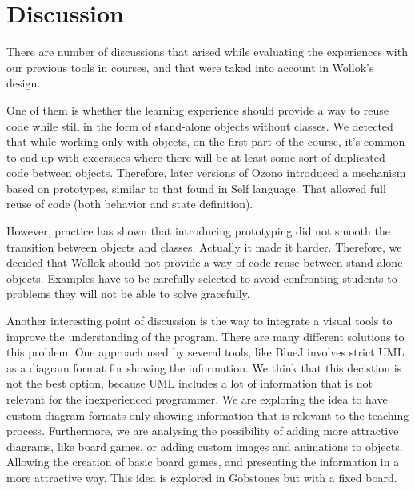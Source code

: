 \section{Discussion}
\label{sec:discussion}

There are number of discussions that arised while evaluating the experiences
with our previous tools in courses, and that were taked into account in Wollok's
design.

One of them is whether the learning experience should provide a way to reuse
code while still in the form of stand-alone objects without classes.
We detected that while working only with objects, on the first part of the
course, it's common to end-up with excersices where there will be at least some
sort of duplicated code between objects.
Therefore, later versions of Ozono introduced a mechanism based on prototypes, 
similar to that found in Self language\cite{Ungar87self:the, Ungar91organizingprograms}. 
That allowed full reuse of code (both behavior and state definition).

However, practice has shown that introducing prototyping did not smooth the transition between objects and classes. Actually it made it harder.
Therefore, we decided that Wollok should not provide a way of code-reuse between stand-alone objects.
Examples have to be carefully selected to avoid confronting students to problems they will not be able to solve gracefully.

\medskip 
Another interesting point of discussion is the way to integrate a visual tools
to improve the understanding of the program. There are many different solutions
to this problem. One approach used by several tools, like BlueJ
\cite{bennedsen_bluej_2010} involves strict UML as a diagram format for showing
the information.
We think that this decistion is not the best option, because UML  
includes a lot of information that is not relevant for the inexperienced programmer. 
We are exploring the idea to have custom diagram formats only showing information that 
is relevant to the teaching process. Furthermore, we are analysing the possibility of 
adding more attractive diagrams, like board games, or adding custom images and
animations to objects.
Allowing the creation of basic board games, and presenting the information in a more attractive way. 
This idea is explored in Gobstones \cite{lopez_nombre_2012} but with a fixed board.

